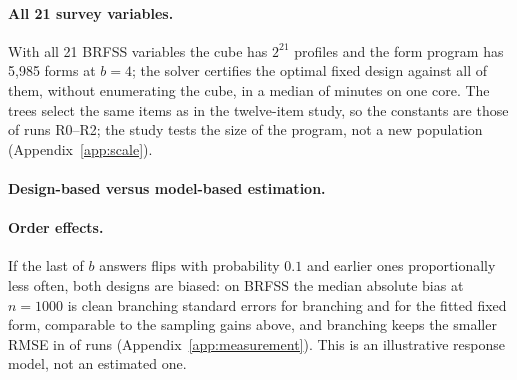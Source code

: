 \paragraph{All 21 survey variables.}
With all 21 BRFSS variables the cube has $2^{21}$ profiles and the form program has 5,985 forms at $b=4$; the solver certifies the optimal fixed design against all of them, without enumerating the cube, in a median of \nScaleMin{} minutes on one core. The trees select the same items as in the twelve-item study, so the constants are those of runs R0--R2; the study tests the size of the program, not a new population (Appendix~\ref{app:scale}).

\paragraph{Design-based versus model-based estimation.}
\nModelParagraph

\paragraph{Order effects.}
If the last of $b$ answers flips with probability $0.1$ and earlier ones proportionally less often, both designs are biased: on BRFSS the median absolute bias at $n=1000$ is \nPosBranch{} clean branching standard errors for branching and \nPosFit{} for the fitted fixed form, comparable to the sampling gains above, and branching keeps the smaller RMSE in \nPosWin{} of \nPosN{} runs (Appendix~\ref{app:measurement}). This is an illustrative response model, not an estimated one.
